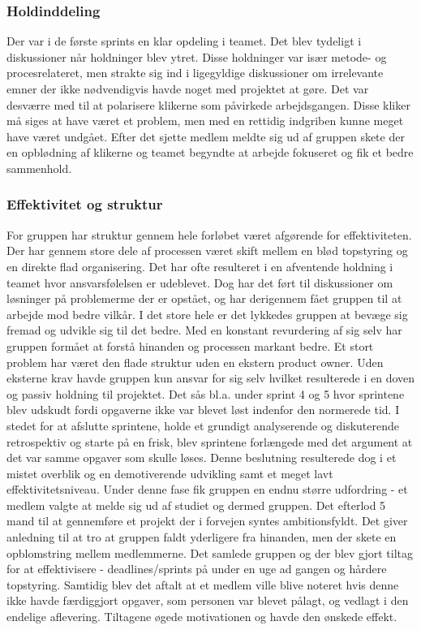 \subsubsection{Holdinddeling}
Der var i de første sprints en klar opdeling i teamet. Det blev tydeligt i diskussioner når holdninger blev ytret. Disse holdninger var især metode- og procesrelateret, men strakte sig ind i ligegyldige diskussioner om irrelevante emner der ikke nødvendigvis havde noget med projektet at gøre. Det var desværre med til at polarisere klikerne som påvirkede arbejdsgangen. Disse kliker må siges at have været et problem, men med en rettidig indgriben kunne meget have været undgået. Efter det sjette medlem meldte sig ud af gruppen skete der en opblødning af klikerne og teamet begyndte at arbejde fokuseret og fik et bedre sammenhold.

\subsubsection{Effektivitet og struktur}
For gruppen har struktur gennem hele forløbet været afgørende for effektiviteten. Der har gennem store dele af processen været skift mellem en blød topstyring og en direkte flad organisering. Det har ofte resulteret i en afventende holdning i teamet hvor ansvarsfølelsen er udeblevet. Dog har det ført til diskussioner om løsninger på problemerme der er opstået, og har derigennem fået gruppen til at arbejde mod bedre vilkår. I det store hele er det lykkedes gruppen at bevæge sig fremad og udvikle sig til det bedre. Med en konstant revurdering af sig selv har gruppen formået at forstå hinanden og processen markant bedre.
Et stort problem har været den flade struktur uden en ekstern product owner. Uden eksterne krav havde gruppen kun ansvar for sig selv hvilket resulterede i en doven og passiv holdning til projektet. Det sås bl.a. under sprint 4 og 5 hvor sprintene blev udskudt fordi opgaverne ikke var blevet løst indenfor den normerede tid. I stedet for at afslutte  sprintene, holde et grundigt analyserende og diskuterende retrospektiv og starte på en frisk, blev sprintene forlængede med det argument at det var samme opgaver som skulle løses. Denne beslutning resulterede dog i et mistet overblik og en demotiverende udvikling samt et meget lavt effektivitetsniveau. Under denne fase fik gruppen en endnu større udfordring - et medlem valgte at melde sig ud af studiet og dermed gruppen. Det efterlod 5 mand til at gennemføre et projekt der i forvejen syntes ambitionsfyldt. Det giver anledning til at tro at gruppen faldt yderligere fra hinanden, men der skete en opblomstring mellem medlemmerne. Det samlede gruppen og der blev gjort tiltag for at effektivisere - deadlines/sprints på under en uge ad gangen og hårdere topstyring. Samtidig blev det aftalt at et medlem ville blive noteret hvis denne ikke havde færdiggjort opgaver, som personen var blevet pålagt, og vedlagt i den endelige aflevering. Tiltagene øgede motivationen og havde den ønskede effekt.

